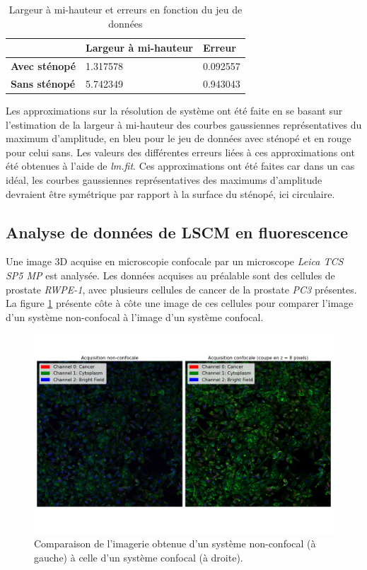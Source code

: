 \documentclass[11pt,letterpaper]{article}
\begin{document}
\begin{table}[H]
\centering
\begin{tabular}{|p{3.2cm}|p{4.2cm}|p{3.2cm}|}
\cline{2-3}
\multicolumn{1}{c|}{} & \textbf{Largeur à mi-hauteur} & \textbf{Erreur} \\
\hline
\textbf{Avec sténopé} & 1.317578 & 0.092557 \\
\hline
\textbf{Sans sténopé} & 5.742349 & 0.943043 \\
\hline
\end{tabular}
\caption{Largeur à mi-hauteur et erreurs en fonction du jeu de données}
\label{FMWH}
\end{table}

Les approximations sur la résolution de système ont été faite en se basant sur l'estimation de la largeur à mi-hauteur des courbes gaussiennes représentatives du maximum d'amplitude, en bleu pour le jeu de données avec sténopé et en rouge pour celui sans. Les valeurs des différentes erreurs liées à ces approximations ont été obtenues à l'aide de \textit{lm.fit}. Ces approximations ont été faites car dans un cas idéal, les courbes gaussiennes représentatives des maximums d'amplitude devraient être symétrique par rapport à la surface du sténopé, ici circulaire. 

\subsection{Analyse de données de LSCM en fluorescence}

Une image 3D acquise en microscopie confocale par un microscope \textit{Leica TCS SP5 MP} est analysée. Les données
acquises au préalable sont des cellules de prostate \textit{RWPE-1}, avec plusieurs cellules de cancer de la prostate
\textit{PC3} présentes. La figure \ref{non_yes_confo} présente côte à côte une image de ces cellules pour comparer
l'image d'un système non-confocal à l'image d'un système confocal.

\begin{figure}[H]
  \centering
  \includegraphics[scale=0.45]{non_and_yes_confocal.png}
  \caption{Comparaison de l'imagerie obtenue d'un système non-confocal (à gauche) à celle d'un système confocal (à droite).}
  \label{non_yes_confo}
\end{figure}
\end{document}
